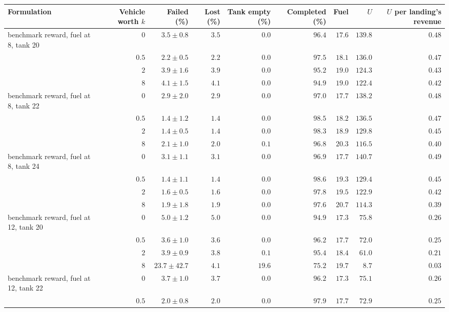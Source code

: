 \begin{tabular}{lrrrrrrrr}
\toprule
Formulation & Vehicle worth $k$ & Failed (\%) & Lost (\%) & Tank empty (\%) & Completed (\%) & Fuel & $U$ & $U$ per landing's revenue \\
\midrule
benchmark reward, fuel at 8, tank 20 & $0$ & $3.5\pm0.8$ & $3.5$ & $0.0$ & $96.4$ & $17.6$ & $139.8$ & $0.48$ \\
 & $0.5$ & $2.2\pm0.5$ & $2.2$ & $0.0$ & $97.5$ & $18.1$ & $136.0$ & $0.47$ \\
 & $2$ & $3.9\pm1.6$ & $3.9$ & $0.0$ & $95.2$ & $19.0$ & $124.3$ & $0.43$ \\
 & $8$ & $4.1\pm1.5$ & $4.1$ & $0.0$ & $94.9$ & $19.0$ & $122.4$ & $0.42$ \\
\addlinespace
benchmark reward, fuel at 8, tank 22 & $0$ & $2.9\pm2.0$ & $2.9$ & $0.0$ & $97.0$ & $17.7$ & $138.2$ & $0.48$ \\
 & $0.5$ & $1.4\pm1.2$ & $1.4$ & $0.0$ & $98.5$ & $18.2$ & $136.5$ & $0.47$ \\
 & $2$ & $1.4\pm0.5$ & $1.4$ & $0.0$ & $98.3$ & $18.9$ & $129.8$ & $0.45$ \\
 & $8$ & $2.1\pm1.0$ & $2.0$ & $0.1$ & $96.8$ & $20.3$ & $116.5$ & $0.40$ \\
\addlinespace
benchmark reward, fuel at 8, tank 24 & $0$ & $3.1\pm1.1$ & $3.1$ & $0.0$ & $96.9$ & $17.7$ & $140.7$ & $0.49$ \\
 & $0.5$ & $1.4\pm1.1$ & $1.4$ & $0.0$ & $98.6$ & $19.3$ & $129.4$ & $0.45$ \\
 & $2$ & $1.6\pm0.5$ & $1.6$ & $0.0$ & $97.8$ & $19.5$ & $122.9$ & $0.42$ \\
 & $8$ & $1.9\pm1.8$ & $1.9$ & $0.0$ & $97.6$ & $20.7$ & $114.3$ & $0.39$ \\
\addlinespace
benchmark reward, fuel at 12, tank 20 & $0$ & $5.0\pm1.2$ & $5.0$ & $0.0$ & $94.9$ & $17.3$ & $75.8$ & $0.26$ \\
 & $0.5$ & $3.6\pm1.0$ & $3.6$ & $0.0$ & $96.2$ & $17.7$ & $72.0$ & $0.25$ \\
 & $2$ & $3.9\pm0.9$ & $3.8$ & $0.1$ & $95.4$ & $18.4$ & $61.0$ & $0.21$ \\
 & $8$ & $23.7\pm42.7$ & $4.1$ & $19.6$ & $75.2$ & $19.7$ & $8.7$ & $0.03$ \\
\addlinespace
benchmark reward, fuel at 12, tank 22 & $0$ & $3.7\pm1.0$ & $3.7$ & $0.0$ & $96.2$ & $17.3$ & $75.1$ & $0.26$ \\
 & $0.5$ & $2.0\pm0.8$ & $2.0$ & $0.0$ & $97.9$ & $17.7$ & $72.9$ & $0.25$ \\

\end{tabular}
